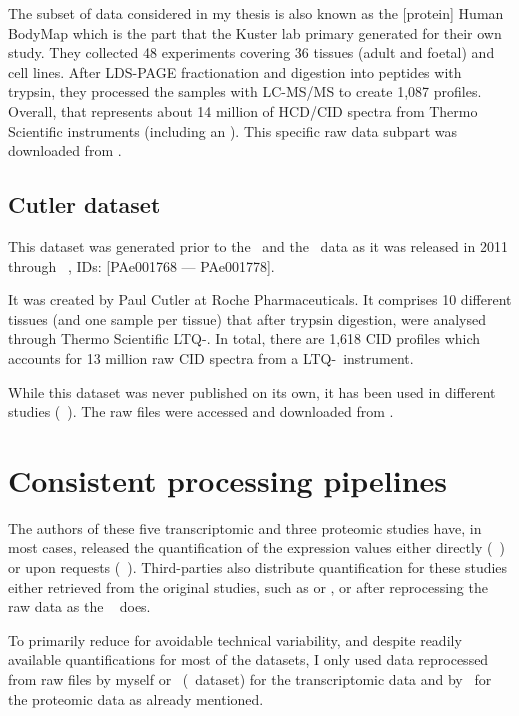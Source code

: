 The subset of data considered in my thesis is also
known as the [protein] Human BodyMap which is the part that the Kuster lab
primary generated for their own study. They collected 48 experiments covering 36
tissues (adult and foetal) and cell lines. After \gls{LDS-PAGE} fractionation and
digestion into peptides with trypsin, they processed the samples with
\gls{LC-MS/MS} to create 1,087 profiles.  Overall, that represents about
14 million of \gls{HCD}/\gls{CID} spectra from Thermo Scientific instruments
(including an \orbi).
This specific raw data subpart was downloaded from .

\subsection{Cutler dataset}\label{subsec:cutler}

This dataset was generated prior to the \pandey\ and the \kuster\
data as it was released in 2011 through
~,
IDs: [PAe001768 --- PAe001778].

It was created by Paul Cutler at Roche Pharmaceuticals.
It comprises 10 different tissues (and one sample per tissue) that after trypsin
digestion, were analysed through Thermo Scientific \gls{LTQ}-\orbi.
In total, there are 1,618 \gls{CID} profiles which accounts for 13 million raw
\gls{CID} spectra from a \gls{LTQ}-\orbi\ instrument.

While this dataset was never published on its own, it has been used in different
studies (\eg~\cite{KusterData}).
The raw files were accessed and downloaded from .


\section{Consistent processing pipelines}

The authors of these five transcriptomic and three proteomic studies have,
in most cases,
released the quantification of the expression values either directly
(\eg~\cite{Krupp2012}) or upon requests (\eg~\cite{PandeyData}).
Third-parties also distribute
quantification for these studies either retrieved from the original studies,
such as \hFoCi{BioGPS}{http://biogps.org/}{BioGPS1} or
,
or after reprocessing the raw data as the \egxa~\mycite{EBIgxa} does.

To primarily reduce for avoidable technical variability,
and despite readily available quantifications for most of the
datasets, I only used data reprocessed from raw files by myself or \nuno\
(\gtex\ dataset) for the transcriptomic data and by \james\
for the proteomic data as already mentioned.

